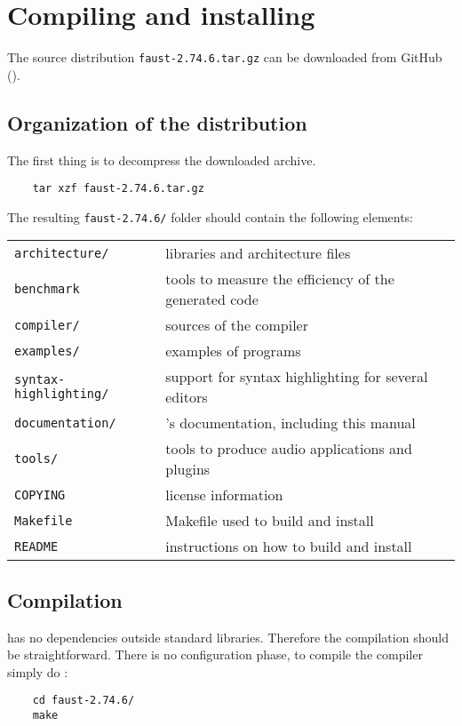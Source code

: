 \chapter{Compiling and installing \faust}
\label{install}

The \faust source distribution \lstinline'faust-2.74.6.tar.gz' can be downloaded from GitHub ().

\section{Organization of the distribution}
The first thing is to decompress the downloaded archive. 
\begin{lstlisting}
	tar xzf faust-2.74.6.tar.gz
\end{lstlisting}

The resulting \lstinline'faust-2.74.6/' folder should contain the following elements:

\begin{tabular}{ll}
	\lstinline'architecture/' 		&\faust libraries and architecture files\\
	\lstinline'benchmark'			&tools to measure the efficiency of the generated code\\
	\lstinline'compiler/'			&sources of the \faust compiler\\
	\lstinline'examples/'			&examples of \faust programs\\
	\lstinline'syntax-highlighting/'&	support for syntax highlighting for several editors\\
	\lstinline'documentation/' 		&\faust's documentation, including this manual\\
	\lstinline'tools/'				&tools to produce audio applications and plugins\\
	\lstinline'COPYING'			&license information\\
	\lstinline'Makefile'			&Makefile used to build and install \faust\\
	\lstinline'README'			&instructions on how to build and install \faust
\end{tabular}

\section{Compilation}
\faust has no dependencies outside standard libraries. Therefore the compilation should be straightforward. There is no configuration phase, to compile the \faust compiler simply do :
\begin{lstlisting}
	cd faust-2.74.6/
	make
\end{lstlisting}

